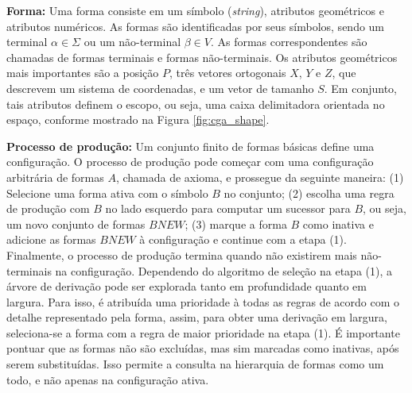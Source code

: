 \textbf{Forma:} Uma forma consiste em um símbolo (\textit{string}), atributos geométricos e atributos numéricos. As formas são identificadas por seus símbolos, sendo um terminal $\alpha \in \Sigma$ ou um não-terminal $\beta \in V$. As formas correspondentes são chamadas de formas terminais e formas não-terminais. Os atributos geométricos mais importantes são a posição $P$, três vetores ortogonais $X$, $Y$ e $Z$, que descrevem um sistema de coordenadas, e um vetor de tamanho $S$. Em conjunto, tais atributos definem o escopo, ou seja, uma caixa delimitadora orientada no espaço, conforme mostrado na Figura \ref{fig:cga_shape}.

\begin{figure}[h!]
	\centering
	\captionsetup{width=15cm}
	{}	
\end{figure}

\textbf{Processo de produção:} Um conjunto finito de formas básicas define uma configuração. O processo de produção pode começar com uma configuração arbitrária de formas $A$, chamada de axioma, e prossegue da seguinte maneira: (1) Selecione uma forma ativa com o símbolo $B$ no conjunto; (2) escolha uma regra de produção com $B$ no lado esquerdo para computar um sucessor para $B$, ou seja, um novo conjunto de formas $BNEW$; (3) marque a forma $B$ como inativa e adicione as formas $BNEW$ à configuração e continue com a etapa (1). Finalmente, o processo de produção termina quando não existirem mais não-terminais na configuração. Dependendo do algoritmo de seleção na etapa (1), a árvore de derivação pode ser explorada tanto em profundidade quanto em largura. Para isso, é atribuída uma prioridade à todas as regras de acordo com o detalhe representado pela forma, assim, para obter uma derivação em largura, seleciona-se a forma com a regra de maior prioridade na etapa (1). É importante pontuar que as formas não são excluídas, mas sim marcadas como inativas, após serem substituídas. Isso permite a consulta na hierarquia de formas como um todo, e não apenas na configuração ativa.

